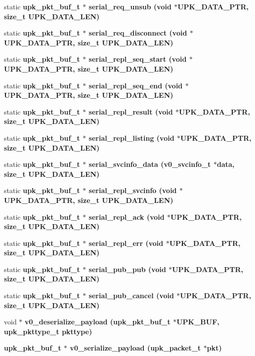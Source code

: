 \begin{CompactItemize}
\item 
static \bf{upk\_\-pkt\_\-buf\_\-t} $\ast$ \bf{serial\_\-req\_\-unsub} (void $\ast$UPK\_\-DATA\_\-PTR, size\_\-t UPK\_\-DATA\_\-LEN)
\item 
static \bf{upk\_\-pkt\_\-buf\_\-t} $\ast$ \bf{serial\_\-req\_\-disconnect} (void $\ast$UPK\_\-DATA\_\-PTR, size\_\-t UPK\_\-DATA\_\-LEN)
\item 
static \bf{upk\_\-pkt\_\-buf\_\-t} $\ast$ \bf{serial\_\-repl\_\-seq\_\-start} (void $\ast$UPK\_\-DATA\_\-PTR, size\_\-t UPK\_\-DATA\_\-LEN)
\item 
static \bf{upk\_\-pkt\_\-buf\_\-t} $\ast$ \bf{serial\_\-repl\_\-seq\_\-end} (void $\ast$UPK\_\-DATA\_\-PTR, size\_\-t UPK\_\-DATA\_\-LEN)
\item 
static \bf{upk\_\-pkt\_\-buf\_\-t} $\ast$ \bf{serial\_\-repl\_\-result} (void $\ast$UPK\_\-DATA\_\-PTR, size\_\-t UPK\_\-DATA\_\-LEN)
\item 
static \bf{upk\_\-pkt\_\-buf\_\-t} $\ast$ \bf{serial\_\-repl\_\-listing} (void $\ast$UPK\_\-DATA\_\-PTR, size\_\-t UPK\_\-DATA\_\-LEN)
\item 
static \bf{upk\_\-pkt\_\-buf\_\-t} $\ast$ \bf{serial\_\-svcinfo\_\-data} (\bf{v0\_\-svcinfo\_\-t} $\ast$data, size\_\-t UPK\_\-DATA\_\-LEN)
\item 
static \bf{upk\_\-pkt\_\-buf\_\-t} $\ast$ \bf{serial\_\-repl\_\-svcinfo} (void $\ast$UPK\_\-DATA\_\-PTR, size\_\-t UPK\_\-DATA\_\-LEN)
\item 
static \bf{upk\_\-pkt\_\-buf\_\-t} $\ast$ \bf{serial\_\-repl\_\-ack} (void $\ast$UPK\_\-DATA\_\-PTR, size\_\-t UPK\_\-DATA\_\-LEN)
\item 
static \bf{upk\_\-pkt\_\-buf\_\-t} $\ast$ \bf{serial\_\-repl\_\-err} (void $\ast$UPK\_\-DATA\_\-PTR, size\_\-t UPK\_\-DATA\_\-LEN)
\item 
static \bf{upk\_\-pkt\_\-buf\_\-t} $\ast$ \bf{serial\_\-pub\_\-pub} (void $\ast$UPK\_\-DATA\_\-PTR, size\_\-t UPK\_\-DATA\_\-LEN)
\item 
static \bf{upk\_\-pkt\_\-buf\_\-t} $\ast$ \bf{serial\_\-pub\_\-cancel} (void $\ast$UPK\_\-DATA\_\-PTR, size\_\-t UPK\_\-DATA\_\-LEN)
\item 
void $\ast$ \bf{v0\_\-deserialize\_\-payload} (\bf{upk\_\-pkt\_\-buf\_\-t} $\ast$UPK\_\-BUF, \bf{upk\_\-pkttype\_\-t} pkttype)
\item 
\bf{upk\_\-pkt\_\-buf\_\-t} $\ast$ \bf{v0\_\-serialize\_\-payload} (\bf{upk\_\-packet\_\-t} $\ast$pkt)
\end{CompactItemize}
